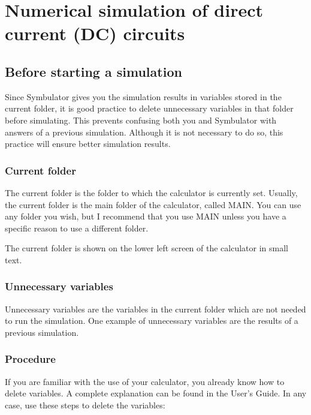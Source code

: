
\chapter{Numerical simulation of direct current (DC) circuits}

\section{Before starting a simulation}

Since Symbulator gives you the simulation results in variables
stored in the current folder, it is good practice to delete
unnecessary variables in that folder before simulating. This
prevents confusing both you and Symbulator with answers of a
previous simulation. Although it is not necessary to do so, this
practice will ensure better simulation results.

\subsection{Current folder}

The current folder is the folder to which the calculator is
currently set. Usually, the current folder is the main folder of the
calculator, called MAIN. You can use any folder you wish, but I
recommend that you use MAIN unless you have a specific reason to use
a different folder.

The current folder is shown on the lower left screen of the
calculator in small text.

\subsection{Unnecessary variables}

Unnecessary variables are the variables in the current folder which
are not needed to run the simulation. One example of unnecessary
variables are the results of a previous simulation.

\subsection{Procedure}

If you are familiar with the use of your calculator, you already
know how to delete variables. A complete explanation can be found in
the User's Guide. In any case, use these steps to delete the
variables:

